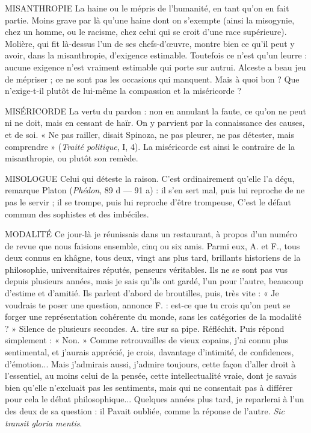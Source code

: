 MISANTHROPIE La haine ou le mépris de l'humanité, en tant qu’on en fait
partie. Moins grave par là qu’une haine dont on s’exempte
(ainsi la misogynie, chez un homme, ou le racisme, chez celui qui se croit d’une
race supérieure). Molière, qui fit là-dessus l’un de ses chefs-d’œuvre, montre
bien ce qu’il peut y avoir, dans la misanthropie, d’exigence estimable. Toutefois
ce n'est qu'un leurre : aucune exigence n’est vraiment estimable qui porte sur
autrui. Alceste a beau jeu de mépriser ; ce ne sont pas les occasions qui manquent.
Mais à quoi bon ? Que n’exige-t-il plutôt de lui-même la compassion et
la miséricorde ?

MISÉRICORDE La vertu du pardon : non en annulant la faute, ce qu’on ne
peut ni ne doit, mais en cessant de haïr. On y parvient par
la connaissance des causes, et de soi. « Ne pas railler, disait Spinoza, ne pas
pleurer, ne pas détester, mais comprendre » ({\it Traité politique}, I, 4). La miséricorde
est ainsi le contraire de la misanthropie, ou plutôt son remède.

MISOLOGUE Celui qui déteste la raison. C’est ordinairement qu’elle l’a
déçu, remarque Platon ({\it Phédon}, 89 d — 91 a) : il s’en sert
mal, puis lui reproche de ne pas le servir ; il se trompe, puis lui reproche d’être
trompeuse, C’est le défaut commun des sophistes et des imbéciles.

MODALITÉ Ce jour-là je réunissais dans un restaurant, à propos d’un
numéro de revue que nous faisions ensemble, cinq ou six amis.
Parmi eux, A. et F., tous deux connus en khâgne, tous deux, vingt ans plus
tard, brillants historiens de la philosophie, universitaires réputés, penseurs véritables.
Ils ne se sont pas vus depuis plusieurs années, mais je sais qu’ils ont
gardé, l’un pour l’autre, beaucoup d’estime et d’amitié. Ils parlent d’abord de
broutilles, puis, très vite : « Je voudrais te poser une question, annonce F. : est-ce
que tu crois qu’on peut se forger une représentation cohérente du monde,
sans les catégories de la modalité ? » Silence de plusieurs secondes. A. tire sur sa
pipe. Réfléchit. Puis répond simplement : « Non. » Comme retrouvailles de
vieux copains, j'ai connu plus sentimental, et j'aurais apprécié, je crois, davantage
d'intimité, de confidences, d'émotion... Mais j’admirais aussi, j'admire
toujours, cette façon d’aller droit à l'essentiel, au moins celui de la pensée, cette
intellectualité vraie, dont je savais bien qu’elle n’excluait pas les sentiments,
mais qui ne consentait pas à différer pour cela le débat philosophique...
Quelques années plus tard, je reparlerai à l’un des deux de sa question : il Pavait
oubliée, comme la réponse de l’autre. {\it Sic transit gloria mentis}.

